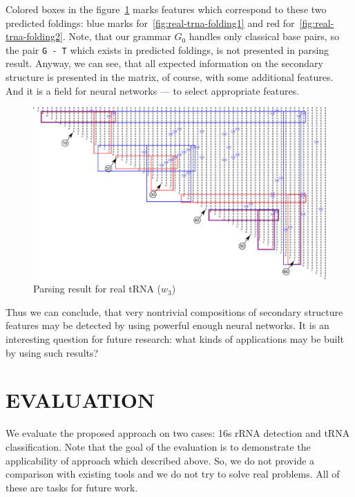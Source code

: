 \documentclass[a4paper,twoside]{article}
\begin{document}
Colored boxes in the figure~\ref{fig:real-trna} marks features which correspond to these two predicted foldings: blue marks for~\ref{fig:real-trna-folding1} and red for~\ref{fig:real-trna-folding2}.
Note, that our grammar $G_0$ handles only classical base pairs, so the pair \verb|G - T| which exists in predicted foldings, is not presented in parsing result.
Anyway, we can see, that all expected information on the secondary structure is presented in the matrix, of course, with some additional features.
And it is a field for neural networks --- to select appropriate features.

\begin{figure}
\centering
\includegraphics[width=.98\textwidth]{figures/0m.pdf}
\caption{Parsing result for real tRNA ($w_3$)}
\label{fig:real-trna}
\end{figure}

Thus we can conclude, that very nontrivial compositions of secondary structure features may be detected by using powerful enough neural networks.
It is an interesting question for future research: what kinds of applications may be built by using such results?

\section{\uppercase{Evaluation}}
\label{sec:evaluation}

\noindent We evaluate the proposed approach on two cases: 16s rRNA detection and tRNA classification.
Note that the goal of the evaluation is to demonstrate the applicability of approach which described above.
So, we do not provide a comparison with existing tools and we do not try to solve real problems.
All of these are tasks for future work.
\end{document}
